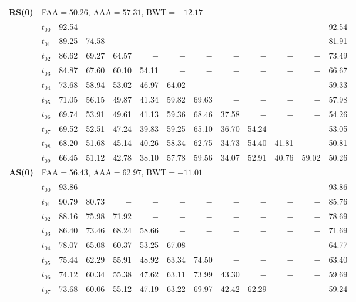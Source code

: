 \begin{table}[ht]
\begin{tabular}{@{}l l r r r r r r r r r r r@{}}
\midrule
\multirow{11}{*}{\textbf{RS(0)}} & \multicolumn{12}{l}{\quad\small FAA$=50.26$,\; AAA$=57.31$,\; BWT$=-12.17$} \\
 & $t_{00}$ & 92.54 & $-$ & $-$ & $-$ & $-$ & $-$ & $-$ & $-$ & $-$ & $-$ & 92.54 \\
 & $t_{01}$ & 89.25 & 74.58 & $-$ & $-$ & $-$ & $-$ & $-$ & $-$ & $-$ & $-$ & 81.91 \\
 & $t_{02}$ & 86.62 & 69.27 & 64.57 & $-$ & $-$ & $-$ & $-$ & $-$ & $-$ & $-$ & 73.49 \\
 & $t_{03}$ & 84.87 & 67.60 & 60.10 & 54.11 & $-$ & $-$ & $-$ & $-$ & $-$ & $-$ & 66.67 \\
 & $t_{04}$ & 73.68 & 58.94 & 53.02 & 46.97 & 64.02 & $-$ & $-$ & $-$ & $-$ & $-$ & 59.33 \\
 & $t_{05}$ & 71.05 & 56.15 & 49.87 & 41.34 & 59.82 & 69.63 & $-$ & $-$ & $-$ & $-$ & 57.98 \\
 & $t_{06}$ & 69.74 & 53.91 & 49.61 & 41.13 & 59.36 & 68.46 & 37.58 & $-$ & $-$ & $-$ & 54.26 \\
 & $t_{07}$ & 69.52 & 52.51 & 47.24 & 39.83 & 59.25 & 65.10 & 36.70 & 54.24 & $-$ & $-$ & 53.05 \\
 & $t_{08}$ & 68.20 & 51.68 & 45.14 & 40.26 & 58.34 & 62.75 & 34.73 & 54.40 & 41.81 & $-$ & 50.81 \\
 & $t_{09}$ & 66.45 & 51.12 & 42.78 & 38.10 & 57.78 & 59.56 & 34.07 & 52.91 & 40.76 & 59.02 & 50.26 \\
\midrule
\multirow{11}{*}{\textbf{AS(0)}} & \multicolumn{12}{l}{\quad\small FAA$=56.43$,\; AAA$=62.97$,\; BWT$=-11.01$} \\
 & $t_{00}$ & 93.86 & $-$ & $-$ & $-$ & $-$ & $-$ & $-$ & $-$ & $-$ & $-$ & 93.86 \\
 & $t_{01}$ & 90.79 & 80.73 & $-$ & $-$ & $-$ & $-$ & $-$ & $-$ & $-$ & $-$ & 85.76 \\
 & $t_{02}$ & 88.16 & 75.98 & 71.92 & $-$ & $-$ & $-$ & $-$ & $-$ & $-$ & $-$ & 78.69 \\
 & $t_{03}$ & 86.40 & 73.46 & 68.24 & 58.66 & $-$ & $-$ & $-$ & $-$ & $-$ & $-$ & 71.69 \\
 & $t_{04}$ & 78.07 & 65.08 & 60.37 & 53.25 & 67.08 & $-$ & $-$ & $-$ & $-$ & $-$ & 64.77 \\
 & $t_{05}$ & 75.44 & 62.29 & 55.91 & 48.92 & 63.34 & 74.50 & $-$ & $-$ & $-$ & $-$ & 63.40 \\
 & $t_{06}$ & 74.12 & 60.34 & 55.38 & 47.62 & 63.11 & 73.99 & 43.30 & $-$ & $-$ & $-$ & 59.69 \\
 & $t_{07}$ & 73.68 & 60.06 & 55.12 & 47.19 & 63.22 & 69.97 & 42.42 & 62.29 & $-$ & $-$ & 59.24 \\

\end{tabular}
\end{table}
